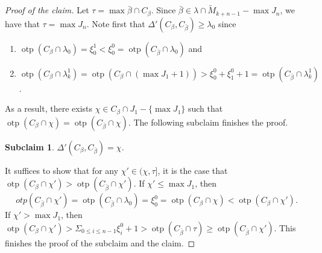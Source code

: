\documentclass[10pt,a4paper]{amsart}
\newtheorem{subclaim}{Subclaim}
\DeclareMathOperator{\otp}{otp}
\begin{document}
	\begin{proof}[Proof of the claim]
	Let $\tau = \max \bar{\beta}\cap C_\beta$. Since $\bar{\beta}\in \lambda\cap \tilde{M}_{k+n-1}-\max J_n$, we have that $\tau = \max J_n$.
	Note first that $\Delta'(C_{\beta}, C_{\bar{\beta}})\geq \lambda_0$ since
		\begin{enumerate}
		\item $\otp(C_\beta\cap \lambda_0) = \xi^1_0 < \xi^0_0 =\otp(C_{\bar{\beta}}\cap \lambda_0)$ and 
		\item $\otp(C_\beta\cap \lambda_k^1) = \otp(C_\beta\cap (\max J_1+1))> \xi^0_0 + \xi^0_1 +1 = \otp(C_{\bar{\beta}}\cap \lambda_k^1)$.
		\end{enumerate}
As a result, there exists $\chi\in C_\beta\cap J_1-\{\max J_1\}$ such that $\otp(C_{\beta}\cap \chi)=\otp(C_{\bar{\beta}}\cap \chi)$. The following subclaim finishes the proof.

	\begin{subclaim}
	$\Delta'(C_{\beta},C_{\bar{\beta}})=\chi$.
	\end{subclaim}
It suffices to show that for any $\chi'\in (\chi, \tau]$, it is the case that $\otp(C_\beta\cap \chi')>\otp(C_{\bar{\beta}}\cap \chi')$. If $\chi'\leq \max J_1$, then $$otp(C_{\bar{\beta}}\cap \chi')=\otp(C_{\bar{\beta}}\cap \lambda_0)=\xi^0_0 = \otp(C_{\beta}\cap \chi)<\otp(C_{\beta}\cap \chi').$$ If $\chi'>\max J_1$, then $\otp(C_\beta\cap \chi')>\Sigma_{0\leq i\leq n-1} \xi^0_{i}+1 > \otp(C_{\bar{\beta}}\cap \tau)\geq \otp(C_{\bar{\beta}}\cap \chi')$. This finishes the proof of the subclaim and the claim.
	\end{proof}
\end{document}
